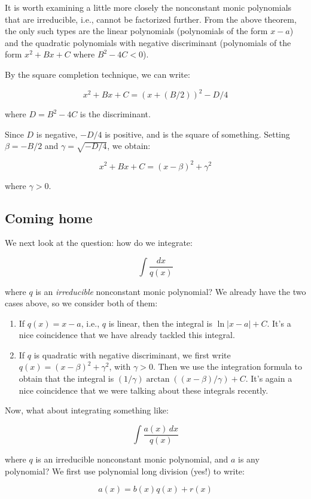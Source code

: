 \documentclass[10pt]{amsart}
\begin{document}
It is worth examining a little more closely the nonconstant monic
polynomials that are irreducible, i.e., cannot be factorized
further. From the above theorem, the only such types are the linear
polynomials (polynomials of the form $x - a$) and the quadratic
polynomials with negative discriminant (polynomials of the form $x^2 +
Bx + C$ where $B^2 - 4C < 0$).

By the square completion technique, we can write:

$$x^2 + Bx + C = (x + (B/2))^2 - D/4$$

where $D = B^2 - 4C$ is the discriminant.

Since $D$ is negative, $-D/4$ is positive, and is the square of
something. Setting $\beta = -B/2$ and $\gamma = \sqrt{-D/4}$, we obtain:

$$x^2 + Bx + C = (x - \beta)^2 + \gamma^2$$

where $\gamma > 0$.

\subsection{Coming home}

We next look at the question: how do we integrate:

$$\int \frac{dx}{q(x)}$$

where $q$ is an {\em irreducible} nonconstant monic polynomial? We
already have the two cases above, so we consider both of them:

\begin{enumerate}
\item If $q(x) = x - a$, i.e., $q$ is linear, then the integral is
  $\ln |x - a| + C$. It's a nice coincidence that we have already tackled
  this integral.
\item If $q$ is quadratic with negative discriminant, we first write
  $q(x) = (x - \beta)^2 + \gamma^2$, with $\gamma > 0$. Then we use
  the integration formula to obtain that the integral is $(1/\gamma)
  \arctan((x - \beta)/\gamma) + C$. It's again a nice coincidence that
  we were talking about these integrals recently.
\end{enumerate}

Now, what about integrating something like:

$$\int \frac{a(x) \, dx}{q(x)}$$

where $q$ is an irreducible nonconstant monic polynomial, and $a$ is
any polynomial? We first use polynomial long division (yes!) to write:


$$a(x) = b(x)q(x) + r(x)$$
\end{document}
